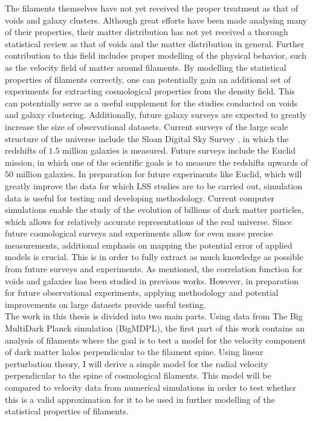 The filaments themselves have not yet received the proper treatment as that of voids and galaxy clusters. Although great efforts have been made analysing many of their properties\cite{Libeskind_2017}, their matter distribution has not yet received a thorough statistical review as that of voids and the matter distribution in general. Further contribution to this field includes proper modelling of the physical behavior, such as the velocity field of matter around filaments. By modelling the statistical properties of filaments correctly, one can potentially gain an additional set of experiments for extracting cosmological properties from the density field. This can potentially serve as a useful supplement for the studies conducted on voids and galaxy clustering. Additionally, future galaxy surveys are expected to greatly increase the size of observational datasets. Current surveys of the large scale structure of the universe include the Sloan Digital Sky Survey \cite{Eisenstein_2011}, in which the redshifts of $1.5$ million galaxies is measured. Future surveys include the Euclid mission, in which one of the scientific goals is to measure the redshifts upwards of $50$ million galaxies\cite{eucliddefinition}. In preparation for future experiments like Euclid, which will greatly improve the data for which LSS studies are to be carried out, simulation data is useful for testing and developing methodology. Current computer simulations enable the study of the evolution of billions of dark matter particles\cite{Millennium}\cite{Multidark_dataset}, which allows for relatively accurate representations of the real universe. Since future cosmological surveys and experiments allow for even more precise measurements, additional emphasis on mapping the potential error of applied models is crucial. This is in order to fully extract as much knowledge as possible from future surveys and experiments. As mentioned, the correlation function for voids and galaxies has been studied in previous works. However, in preparation for future observational experiments, applying methodology and potential improvements on large datasets provide useful testing.\\\indent
The work in this thesis is divided into two main parts. Using data from The Big MultiDark Planck simulation (BigMDPL)\cite{Multidark_dataset}, the first part of this work contains an analysis of filaments where the goal is to test a model for the velocity component of dark matter halos perpendicular to the filament spine. Using linear perturbation theory, I will derive a simple model for the radial velocity perpendicular to the spine of cosmological filaments. This model will be compared to velocity data from numerical simulations in order to test whether this is a valid approximation for it to be used in further modelling of the statistical properties of filaments.

